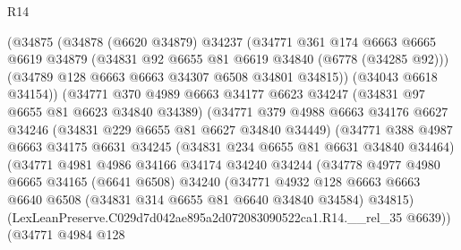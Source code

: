 \begin{lexlean}{R14}
\begin{coremodule}
                    (@34875
                      (@34878
                        (@6620 @34879)
                        @34237
                        (@34771
                          @361
                          @174
                          @6663
                          @6665
                          @6619
                          @34879
                          (@34831 @92 @6655 @81 @6619 @34840 (@6778 (@34285 @92)))
                          (@34789 @128 @6663 @6663 @34307 @6508 @34801 @34815))
                        (@34043 @6618 @34154))
                      (@34771
                        @370
                        @4989
                        @6663
                        @34177
                        @6623
                        @34247
                        (@34831 @97 @6655 @81 @6623 @34840 @34389)
                        (@34771
                          @379
                          @4988
                          @6663
                          @34176
                          @6627
                          @34246
                          (@34831 @229 @6655 @81 @6627 @34840 @34449)
                          (@34771
                            @388
                            @4987
                            @6663
                            @34175
                            @6631
                            @34245
                            (@34831 @234 @6655 @81 @6631 @34840 @34464)
                            (@34771
                              @4981
                              @4986
                              @34166
                              @34174
                              @34240
                              @34244
                              (@34778
                                @4977
                                @4980
                                @6665
                                @34165
                                (@6641 @6508)
                                @34240
                                (@34771
                                  @4932
                                  @128
                                  @6663
                                  @6663
                                  @6640
                                  @6508
                                  (@34831 @314 @6655 @81 @6640 @34840 @34584)
                                  @34815)
                                (LexLeanPreserve.C029d7d042ae895a2d072083090522ca1.R14.__rel_35
                                  @6639))
                              (@34771
                                @4984
                                @128

\end{coremodule}
\end{lexlean}
